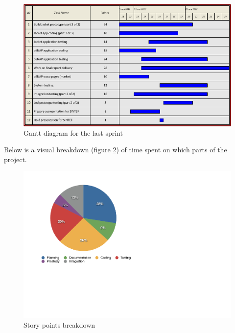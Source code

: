 \begin{figure}[h!]
\centering \includegraphics[scale=0.8]{img/sprints-gantt9.png}
\caption{Gantt diagram for the last sprint}
\label{fig:sprints-gantt9}
\end{figure}

\newpage

Below is a visual breakdown (figure \ref{fig:sprints-points}) of time spent on which parts of the project.


\begin{figure}[h!]
\centering \includegraphics[scale=0.8]{img/pie_chart.pdf}
\caption{Story points breakdown}
\label{fig:sprints-points}
\end{figure}
